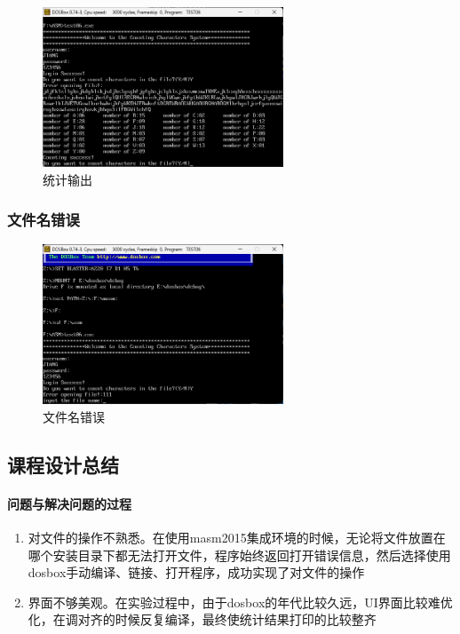 \documentclass[UTF8,12pt]{article}
\begin{document}
\newpage

\begin{figure}[htbp]
    \centering
    \includegraphics[width=0.64\textwidth]{img/7.png}
    \caption{统计输出}
\end{figure}

\subsubsection{文件名错误}
\begin{figure}[htbp]
    \centering
    \includegraphics[width=0.64\textwidth]{img/9.png}
    \caption{文件名错误}
\end{figure}

\newpage

\subsection{课程设计总结}
\paragraph{问题与解决问题的过程}
\begin{enumerate}
    \item 对文件的操作不熟悉。在使用masm2015集成环境的时候，无论将文件放置在哪个安装目录下都无法打开文件，程序始终返回打开错误信息，然后选择使用dosbox手动编译、链接、打开程序，成功实现了对文件的操作
    \item 界面不够美观。在实验过程中，由于dosbox的年代比较久远，UI界面比较难优化，在调对齐的时候反复编译，最终使统计结果打印的比较整齐
\end{enumerate}
\end{document}
